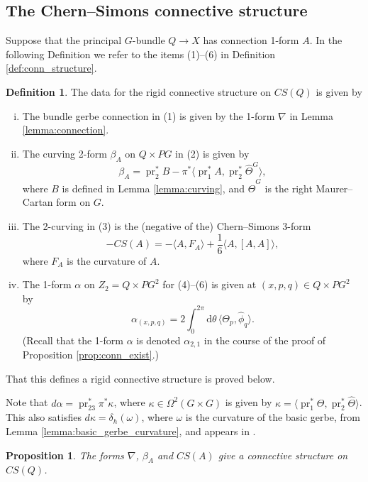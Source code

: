 \documentclass[12pt]{amsart}
\DeclareMathOperator{\pr}{pr}
\theoremstyle{plain}
\newtheorem{proposition}[theorem]{Proposition}
\theoremstyle{definition}
\newtheorem{definition}[theorem]{Definition}
\theoremstyle{remark}
\numberwithin{equation}{section}
\renewcommand{\a}{\alpha}
\newcommand{\<}{\langle}
\renewcommand{\>}{\rangle}
\newcommand{\intSone}{\int_{0}^{2\pi}\mathrm{d}\theta\,}
\newcommand{\Thetahat}{\widehat{\Theta}}
\newcommand{\phihat}{\widehat{\phi}}
\begin{document}
\subsection{The Chern--Simons connective structure}

Suppose that the principal $G$-bundle $Q \to X$ has connection 1-form $A$. In the following Definition we refer to the items (1)--(6) in Definition \ref{def:conn_structure}. \label{form:CS2-gerbe curving} \label{form:CS2-gerbe 2-curving} \label{form:CS2-gerbe alpha}

\begin{definition}\label{def:CS_conn}
The data for the rigid connective structure on $CS(Q)$ is given by 
\begin{enumerate}[(i)]
\item
The bundle gerbe connection in (1) is given by the 1-form $\nabla$ in Lemma \ref{lemma:connection}.
\item
The curving 2-form  $\beta_A$ on $Q \times PG$ in (2) is given by 
\[
  \beta_A = \pr_2^*B - \pi^*\langle\pr_1^*A, \pr_2^* \Thetahat^G\rangle,
\] 
where $B$ is defined in Lemma \ref{lemma:curving}, and $\Thetahat^G$ is the right Maurer--Cartan form on $G$.
\item
The 2-curving in (3) is the (negative of the) Chern--Simons 3-form
\[
  -CS(A) = -\langle A, F_A\rangle + \frac16 \langle A, [A, A]\rangle,
\]
where $F_A$ is the curvature of $A$.
\item 
The 1-form $\a$ on $Z_2 = Q\times PG^2$ for (4)--(6) is given at $(x,p,q)\in Q\times PG^2$  by 
\[
  \alpha_{(x,p,q)}=2\intSone \langle \Theta_p ,\phihat_q \rangle.
\]
(Recall that the 1-form $\alpha$ is denoted $\alpha_{2,1}$ in the course of the proof of Proposition \ref{prop:conn_exist}.)
\end{enumerate}
That this defines a rigid connective structure is proved below.
\end{definition}

\label{form:kappa}
Note that $d\alpha = \pr_{23}^*\pi^*\kappa$, where $\kappa \in \Omega^2(G\times G)$ is given by $\kappa = \langle\pr_1^*\Theta,\pr_2^*\Thetahat\rangle$. This also satisfies $d\kappa = \delta_h(\omega)$, where $\omega$ is the curvature of the basic gerbe, from Lemma \ref{lemma:basic_gerbe_curvature}, and appears in \cite{Wal}. 


\begin{proposition}\label{prop:conn_str}
The forms $\nabla$, $\beta_A$ and $CS(A)$ give a connective structure on $CS(Q)$.
\end{proposition}
\end{document}
